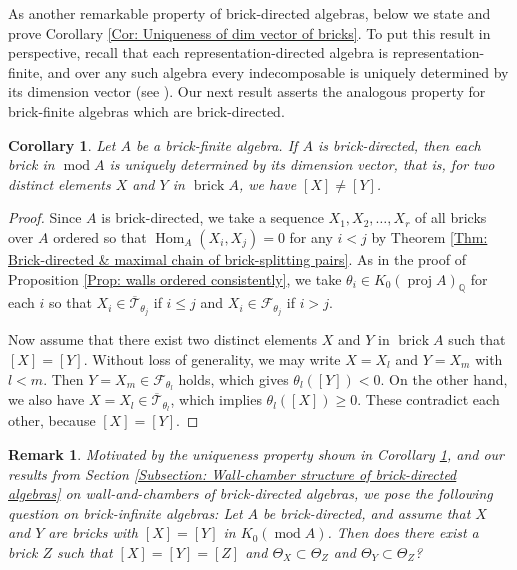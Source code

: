 \documentclass{amsart}
\theoremstyle{thmstyle}
\newtheorem{corollary}[thm]{Corollary}
\theoremstyle{exstyle}
\theoremstyle{defstyle}
\theoremstyle{remstyle}
\newtheorem{remark}[thm]{Remark}
\theoremstyle{remstyle}
\newcommand{\Hom}{\operatorname{Hom}}
\DeclareMathOperator*{\modu}{mod}
\DeclareMathOperator*{\proj}{proj}
\DeclareMathOperator*{\brick}{brick}
\begin{document}
As another remarkable property of brick-directed algebras, below we state and prove Corollary \ref{Cor: Uniqueness of dim vector of bricks}. To put this result in perspective, recall that each representation-directed algebra is representation-finite, and over any such algebra every indecomposable is uniquely determined by its dimension vector (see {\cite[IX. Prop. 1.3]{ASS}}). Our next result asserts the analogous property for brick-finite algebras which are brick-directed.

\begin{corollary}\label{Cor: unique dim vector}
Let $A$ be a brick-finite algebra. If $A$ is brick-directed, then each brick in $\modu A$ is uniquely determined by its dimension vector, that is, for two distinct elements $X$ and $Y$ in $\brick A$, we have $[X] \ne [Y]$.
\end{corollary}
\begin{proof}
Since $A$ is brick-directed, we take a sequence $X_1,X_2,\ldots,X_r$ of all bricks over $A$ ordered so that $\Hom_A(X_i,X_j)=0$ for any $i<j$ by Theorem \ref{Thm: Brick-directed & maximal chain of brick-splitting pairs}. As in the proof of Proposition \ref{Prop: walls ordered consistently}, we take $\theta_i \in K_0(\proj A)_\mathbb{Q}$ for each $i$ so that $X_i \in \overline{\mathcal{T}}_{\theta_j}$ if $i \le j$ and $X_i \in \mathcal{F}_{\theta_j}$ if $i>j$.

Now assume that there exist two distinct elements $X$ and $Y$ in $\brick A$ such that $[X]=[Y]$. Without loss of generality, we may write $X=X_l$ and $Y=X_m$ with $l<m$. Then $Y=X_m \in \mathcal{F}_{\theta_l}$ holds, which gives $\theta_l([Y]) < 0$. On the other hand, we also have $X=X_l \in \overline{\mathcal{T}}_{\theta_l}$, which implies $\theta_l([X]) \ge 0$. These contradict each other, because $[X]=[Y]$.
\end{proof}

\begin{remark}
Motivated by the uniqueness property shown in Corollary \ref{Cor: unique dim vector}, and our results from Section \ref{Subsection: Wall-chamber structure of brick-directed algebras} on wall-and-chambers of brick-directed algebras, we pose the following question on brick-infinite algebras:
Let $A$ be brick-directed, and assume that $X$ and $Y$ are bricks with $[X]=[Y]$ in $K_0(\modu A)$. Then does there exist a brick $Z$ such that $[X]=[Y]=[Z]$ and $\Theta_X \subset \Theta_Z$ and $\Theta_Y \subset \Theta_Z$?  
\end{remark}
\end{document}
